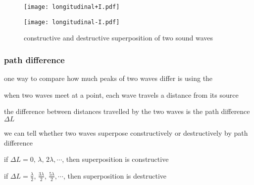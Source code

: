 \begin{figure}[htp]
	\centering
	\noindent\begin{minipage}{0.5\linewidth}
		\centering
		\texttt{[image: longitudinal+I.pdf]}
	\end{minipage}\hfil
	\begin{minipage}{0.5\linewidth}
		\centering
		\texttt{[image: longitudinal-I.pdf]}
	\end{minipage}
	\caption*{constructive and destructive superposition of two sound waves} 
\end{figure}



\subsubsection{path difference}

one way to compare how much peaks of two waves differ is using the 

when two waves meet at a point, each wave travels a distance from its source

the difference between distances travelled by the two waves is the path difference $\Delta L$

\cmt we can tell whether two waves superpose constructively or destructively by path difference

{

\centering
\vspace*{6pt}
\begin{tcolorbox}[colframe=orange, colback=yellow!30, width=0.65\textwidth]
	\setlength{\baselineskip}{\baselineskip}%
	
	\centering
	
	if ${\Delta L = 0, \, \lambda, \, 2\lambda, \cdots}$, then superposition is constructive
	
	if ${\Delta L = \frac{\lambda}{2}, \, \frac{3\lambda}{2}, \, \frac{5\lambda}{2}, \cdots}$, then superposition is destructive
	
\end{tcolorbox}\vspace*{-4pt}

}

\newpage


